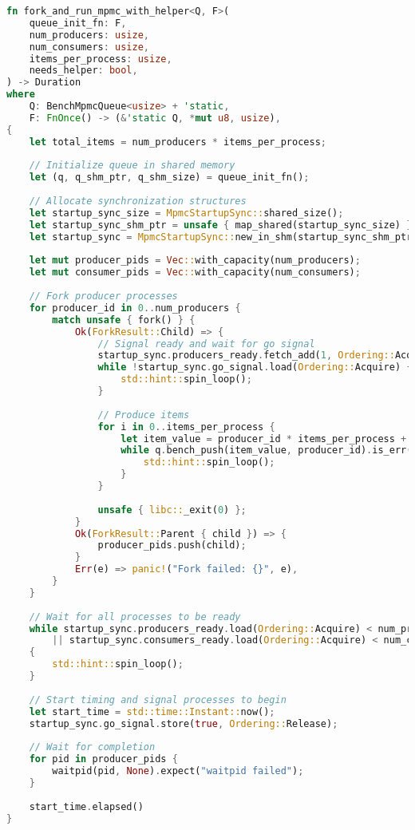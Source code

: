 \begin{lstlisting}[language=Rust, style=boxed, caption={Generic benchmark execution function}, label={lst:fork-and-run}]
fn fork_and_run_mpmc_with_helper<Q, F>(
    queue_init_fn: F,
    num_producers: usize,
    num_consumers: usize,
    items_per_process: usize,
    needs_helper: bool,
) -> Duration
where
    Q: BenchMpmcQueue<usize> + 'static,
    F: FnOnce() -> (&'static Q, *mut u8, usize),
{
    let total_items = num_producers * items_per_process;
    
    // Initialize queue in shared memory
    let (q, q_shm_ptr, q_shm_size) = queue_init_fn();
    
    // Allocate synchronization structures
    let startup_sync_size = MpmcStartupSync::shared_size();
    let startup_sync_shm_ptr = unsafe { map_shared(startup_sync_size) };
    let startup_sync = MpmcStartupSync::new_in_shm(startup_sync_shm_ptr);
    
    let mut producer_pids = Vec::with_capacity(num_producers);
    let mut consumer_pids = Vec::with_capacity(num_consumers);
    
    // Fork producer processes
    for producer_id in 0..num_producers {
        match unsafe { fork() } {
            Ok(ForkResult::Child) => {
                // Signal ready and wait for go signal
                startup_sync.producers_ready.fetch_add(1, Ordering::AcqRel);
                while !startup_sync.go_signal.load(Ordering::Acquire) {
                    std::hint::spin_loop();
                }
                
                // Produce items
                for i in 0..items_per_process {
                    let item_value = producer_id * items_per_process + i;
                    while q.bench_push(item_value, producer_id).is_err() {
                        std::hint::spin_loop();
                    }
                }
                
                unsafe { libc::_exit(0) };
            }
            Ok(ForkResult::Parent { child }) => {
                producer_pids.push(child);
            }
            Err(e) => panic!("Fork failed: {}", e),
        }
    }
    
    // Wait for all processes to be ready
    while startup_sync.producers_ready.load(Ordering::Acquire) < num_producers as u32
        || startup_sync.consumers_ready.load(Ordering::Acquire) < num_consumers as u32
    {
        std::hint::spin_loop();
    }
    
    // Start timing and signal processes to begin
    let start_time = std::time::Instant::now();
    startup_sync.go_signal.store(true, Ordering::Release);
    
    // Wait for completion
    for pid in producer_pids {
        waitpid(pid, None).expect("waitpid failed");
    }
    
    start_time.elapsed()
}
\end{lstlisting}

